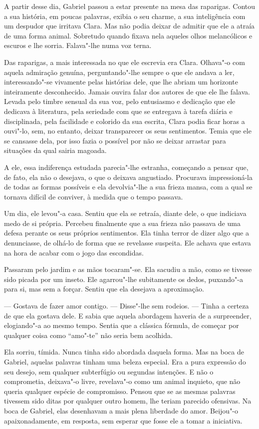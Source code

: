 A partir desse dia, Gabriel passou a estar presente na mesa das
raparigas. Contou a sua história, em poucas palavras, exibia o seu
charme, a sua inteligência com um despudor que irritava Clara. Mas não
podia deixar de admitir que ele a atraía de uma forma animal. Sobretudo
quando fixava nela aqueles olhos melancólicos e escuros e lhe sorria.
Falava"-lhe numa voz terna.

Das raparigas, a mais interessada no que ele escrevia era Clara.
Olhava"-o com aquela admiração genuína, perguntando"-lhe sempre o que ele
andava a ler, interessando"-se vivamente pelas histórias dele, que lhe
abriam um horizonte inteiramente desconhecido. Jamais ouvira falar dos
autores de que ele lhe falava. Levada pelo timbre sensual da sua voz,
pelo entusiasmo e dedicação que ele dedicava à literatura, pela
seriedade com que se entregava à tarefa diária e disciplinada, pela
facilidade e colorido da sua escrita, Clara podia ficar horas a ouvi"-lo,
sem, no entanto, deixar transparecer os seus sentimentos. Temia que ele
se cansasse dela, por isso fazia o possível por não se deixar arrastar
para situações da qual sairia magoada.

A ele, essa indiferença estudada parecia"-lhe estranha, começando a
pensar que, de fato, ela não o desejava, o que o deixava angustiado.
Procurava impressioná-la de todas as formas possíveis e ela devolvia"-lhe
a sua frieza mansa, com a qual se tornava difícil de conviver, à medida
que o tempo passava.

Um dia, ele levou"-a casa. Sentiu que ela se retraía, diante dele, o que
indiciava medo de si própria. Percebeu finalmente que a sua frieza não
passava de uma defesa perante os seus próprios sentimentos. Ela tinha
terror de dizer algo que a denunciasse, de olhá-lo de forma que se
revelasse suspeita. Ele achava que estava na hora de acabar com o jogo
das escondidas.

Passaram pelo jardim e as mãos tocaram"-se. Ela sacudiu a mão, como se
tivesse sido picada por um inseto. Ele agarrou"-lhe subitamente os
dedos, puxando"-a para si, mas sem a forçar. Sentiu que ela desejava a
aproximação.

--- Gostava de fazer amor contigo. --- Disse"-lhe sem rodeios. --- Tinha a
certeza de que ela gostava dele. E sabia que aquela abordagem haveria de
a surpreender, elogiando"-a ao mesmo tempo. Sentia que a clássica
fórmula, de começar por qualquer coisa como ``amo"-te'' não seria bem
acolhida.

Ela sorriu, tímida. Nunca tinha sido abordada daquela forma. Mas na boca
de Gabriel, aquelas palavras tinham uma beleza especial. Era a pura
expressão do seu desejo, sem qualquer subterfúgio ou segundas intenções.
E não o comprometia, deixava"-o livre, revelava"-o como um animal
inquieto, que não queria qualquer espécie de compromisso. Pensou que se
as mesmas palavras tivessem sido ditas por qualquer outro homem, lhe
teriam parecido ofensivas. Na boca de Gabriel, elas desenhavam a mais
plena liberdade do amor. Beijou"-o apaixonadamente, em resposta, sem
esperar que fosse ele a tomar a iniciativa.

